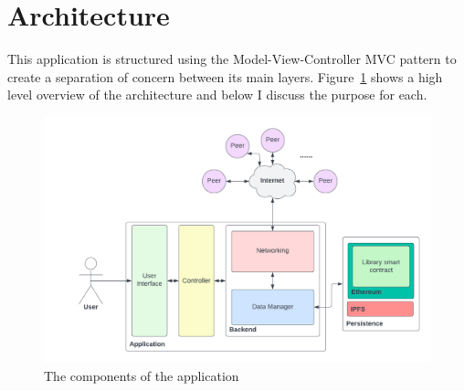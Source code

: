 \section{Architecture}

This application is structured using the Model-View-Controller MVC pattern to create a separation of concern between its main layers. Figure~\ref{fig:impl-layers} shows a high level overview of the architecture and below I discuss the purpose for each.

\begin{figure}[ht]
  \centering
  \includegraphics[width=.8\textwidth]{assets/images/diagrams/layers.png}
  \caption{The components of the application}
  \label{fig:impl-layers}
\end{figure}







